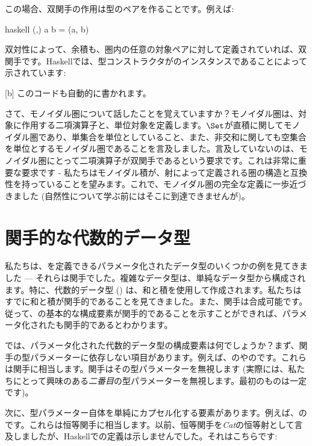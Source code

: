 この場合、双関手の作用は型のペアを作ることです。例えば: 

\begin{snip}{haskell}
(,) a b = (a, b)
\end{snip}
双対性によって、余積も、圏内の任意の対象ペアに対して定義されていれば、双関手です。Haskellでは、型コンストラクタがのインスタンスであることによって示されています: 

[b]
このコードも自動的に書かれます。

さて、モノイダル圏について話したことを覚えていますか？モノイダル圏は、対象に作用する二項演算子と、単位対象を定義します。$\Set$が直積に関してモノイダル圏であり、単集合を単位としていること、また、非交和に関しても空集合を単位とするモノイダル圏であることを言及しました。言及していないのは、モノイダル圏にとって二項演算子が双関手であるという要求です。これは非常に重要な要求です - 私たちはモノイダル積が、射によって定義される圏の構造と互換性を持っていることを望みます。これで、モノイダル圏の完全な定義に一歩近づきました (自然性について学ぶ前にはそこに到達できませんが)。

\section{関手的な代数的データ型}

私たちは、を定義できるパラメータ化されたデータ型のいくつかの例を見てきました --- それらは関手でした。複雑なデータ型は、単純なデータ型から構成されます。特に、代数的データ型 () は、和と積を使用して作成されます。私たちはすでに和と積が関手的であることを見てきました。また、関手は合成可能です。従って、の基本的な構成要素が関手的であることを示すことができれば、パラメータ化されたも関手的であるとわかります。

では、パラメータ化された代数的データ型の構成要素は何でしょうか？まず、関手の型パラメーターに依存しない項目があります。例えば、のやのです。これらは関手に相当します。関手はその型パラメーターを無視します (実際には、私たちにとって興味のある\emph{二番目}の型パラメーターを無視します。最初のものは一定です)。

次に、型パラメーター自体を単純にカプセル化する要素があります。例えば、のです。これらは恒等関手に相当します。以前、恒等関手を\emph{Cat}の恒等射として言及しましたが、Haskellでの定義は示しませんでした。それはこちらです: 


